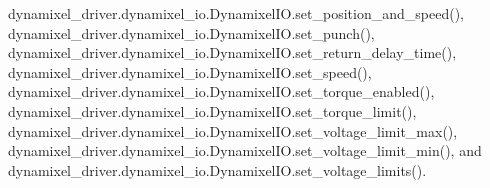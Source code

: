 dynamixel\+\_\+driver.\+dynamixel\+\_\+io.\+Dynamixel\+I\+O.\+set\+\_\+position\+\_\+and\+\_\+speed(), dynamixel\+\_\+driver.\+dynamixel\+\_\+io.\+Dynamixel\+I\+O.\+set\+\_\+punch(), dynamixel\+\_\+driver.\+dynamixel\+\_\+io.\+Dynamixel\+I\+O.\+set\+\_\+return\+\_\+delay\+\_\+time(), dynamixel\+\_\+driver.\+dynamixel\+\_\+io.\+Dynamixel\+I\+O.\+set\+\_\+speed(), dynamixel\+\_\+driver.\+dynamixel\+\_\+io.\+Dynamixel\+I\+O.\+set\+\_\+torque\+\_\+enabled(), dynamixel\+\_\+driver.\+dynamixel\+\_\+io.\+Dynamixel\+I\+O.\+set\+\_\+torque\+\_\+limit(), dynamixel\+\_\+driver.\+dynamixel\+\_\+io.\+Dynamixel\+I\+O.\+set\+\_\+voltage\+\_\+limit\+\_\+max(), dynamixel\+\_\+driver.\+dynamixel\+\_\+io.\+Dynamixel\+I\+O.\+set\+\_\+voltage\+\_\+limit\+\_\+min(), and dynamixel\+\_\+driver.\+dynamixel\+\_\+io.\+Dynamixel\+I\+O.\+set\+\_\+voltage\+\_\+limits().


